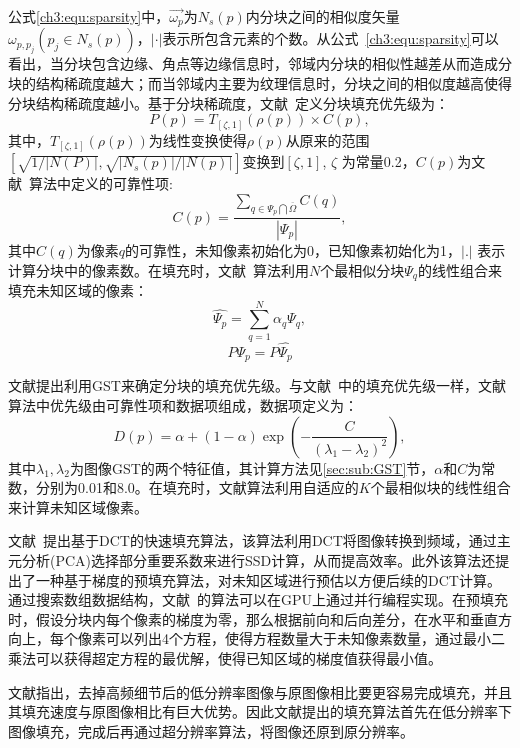 公式\ref{ch3:equ:sparsity}中，$\vec{\omega_p}$为$N_s(p)$内分块之间的相似度矢量$\omega_{p,p_j}(p_j \in N_s(p))$，$|\cdot|$表示所包含元素的个数。从公式~\ref{ch3:equ:sparsity}可以看出，当分块包含边缘、角点等边缘信息时，邻域内分块的相似性越差从而造成分块的结构稀疏度越大；而当邻域内主要为纹理信息时，分块之间的相似度越高使得分块结构稀疏度越小。基于分块稀疏度，文献~定义分块填充优先级为：
$$P(p) = T_{[\zeta,1]}(\rho(p)) \times C(p),$$
其中，$T_{[\zeta,1]}(\rho(p))$为线性变换使得$\rho(p)$从原来的范围$[\sqrt{1/|N(P)|},\sqrt{|N_s(p)|/|N(p)|}]$变换到$[\zeta,1]$, $\zeta$ 为常量0.2，$C(p)$为文献~算法中定义的可靠性项:
\begin{equation}
\label{ch3:equ:confidence}
C(p)=\frac{\sum_{q\in\Psi_p\bigcap\overline{\Omega}}{C(q)}}{\left\vert{\Psi_p}\right\vert},
\end{equation}
其中$C(q)$为像素$q$的可靠性，未知像素初始化为0，已知像素初始化为1，\(\left\vert.\right\vert\)  表示计算分块中的像素数。在填充时，文献~算法利用$N$个最相似分块$\Psi_q$的线性组合来填充未知区域的像素：
$$\hat{\Psi_p}= \sum_{q=1}^{N}{ \alpha_q \Psi_q}, $$
$$P\Psi_p = P\hat{\Psi_{p}}$$ \par
文献提出利用GST来确定分块的填充优先级。与文献~中的填充优先级一样，文献算法中优先级由可靠性项和数据项组成，数据项定义为：
$$ D(p) = \alpha + (1-\alpha)\exp(-\frac{C}{(\lambda_1 - \lambda_2)^2}),$$
其中$\lambda_1,\lambda_2$为图像GST的两个特征值，其计算方法见\ref{sec:sub:GST}节，$\alpha$和$C$为常数，分别为0.01和8.0。在填充时，文献算法利用自适应的$K$个最相似块的线性组合来计算未知区域像素。\par
文献~提出基于DCT的快速填充算法，该算法利用DCT将图像转换到频域，通过主元分析(PCA)选择部分重要系数来进行SSD计算，从而提高效率。此外该算法还提出了一种基于梯度的预填充算法，对未知区域进行预估以方便后续的DCT计算。通过搜索数组数据结构，文献~的算法可以在GPU上通过并行编程实现。在预填充时，假设分块内每个像素的梯度为零，那么根据前向和后向差分，在水平和垂直方向上，每个像素可以列出4个方程，使得方程数量大于未知像素数量，通过最小二乘法可以获得超定方程的最优解，使得已知区域的梯度值获得最小值。 \par
文献指出，去掉高频细节后的低分辨率图像与原图像相比要更容易完成填充，并且其填充速度与原图像相比有巨大优势。因此文献提出的填充算法首先在低分辨率下图像填充，完成后再通过超分辨率算法，将图像还原到原分辨率。\par
